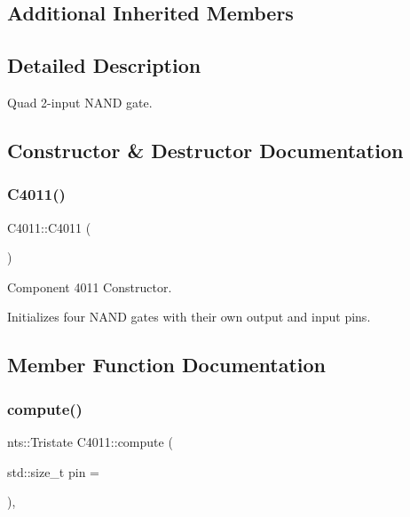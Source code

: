 \subsection*{Additional Inherited Members}


\subsection{Detailed Description}
Quad 2-\/input N\+A\+ND gate. 

\subsection{Constructor \& Destructor Documentation}
\mbox{\label{classC4011_a179e783e10dea1e6caa775991ac90793}} 
\subsubsection{\texorpdfstring{C4011()}{C4011()}}
{\footnotesize\ttfamily C4011\+::\+C4011 (\begin{DoxyParamCaption}{ }\end{DoxyParamCaption})}



Component 4011 Constructor. 

Initializes four N\+A\+ND gates with their own output and input pins. 

\subsection{Member Function Documentation}
\mbox{\label{classC4011_a1ed653298a52928ef7406c8f6817cbf3}} 
\subsubsection{\texorpdfstring{compute()}{compute()}}
{\footnotesize\ttfamily nts\+::\+Tristate C4011\+::compute (\begin{DoxyParamCaption}\item[{std\+::size\+\_\+t}]{pin = {} }\end{DoxyParamCaption})\hspace{0.3cm}{\ttfamily [override]}, {\ttfamily [virtual]}}



